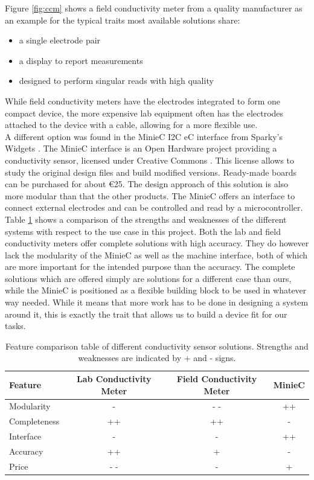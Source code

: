Figure \ref{fig:ccm} shows a field conductivity meter from a quality manufacturer as an example for the typical traits most available solutions share:
\begin{itemize}
	\item a single electrode pair
	\item a display to report measurements
	\item designed to perform singular reads with high quality
\end{itemize}

While field conductivity meters have the electrodes integrated to form one compact device, the more expensive lab equipment often has the electrodes attached to the device with a cable, allowing for a more flexible use.\\

A different option was found in the MinieC I2C eC interface from Sparky's Widgets \parencite{uec}. The MinieC interface is an Open Hardware project providing a conductivity sensor, licensed under Creative Commons \parencite{cc}. This license allows to study the original design files and build modified versions. Ready-made boards can be purchased for about \euro{25}. The design approach of this solution is also more modular than that the other products. The MinieC offers an interface to connect external electrodes and can be controlled and read by a microcontroller.\\

Table \ref{tab:feat} shows a comparison of the strengths and weaknesses of the different systems with respect to the use case in this project. Both the lab and field conductivity meters offer complete solutions with high accuracy. They do however lack the modularity of the MinieC as well as the machine interface, both of which are more important for the intended purpose than the accuracy. The complete solutions which are offered simply are solutions for a different case than ours, while the MinieC is positioned as a flexible building block to be used in whatever way needed. While it means that more work has to be done in designing a system around it, this is exactly the trait that allows us to build a device fit for our tasks.

\begin{table}[H]
    \centering

    \caption[]{Feature comparison table of different conductivity sensor solutions. Strengths and weaknesses are indicated by + and - signs.}
    \label{tab:feat}
    \begin{tabular}{l  c  c  c}
        	\toprule
         Feature & Lab Conductivity Meter & Field Conductivity Meter & MinieC \\
        	\midrule
		Modularity & - & - - & ++ \\
		Completeness & ++ & ++ & - \\
		Interface & - & - & ++ \\
		Accuracy & ++ & + & - \\
		Price & - - & - & + \\
        \bottomrule
    \end{tabular}
\end{table}